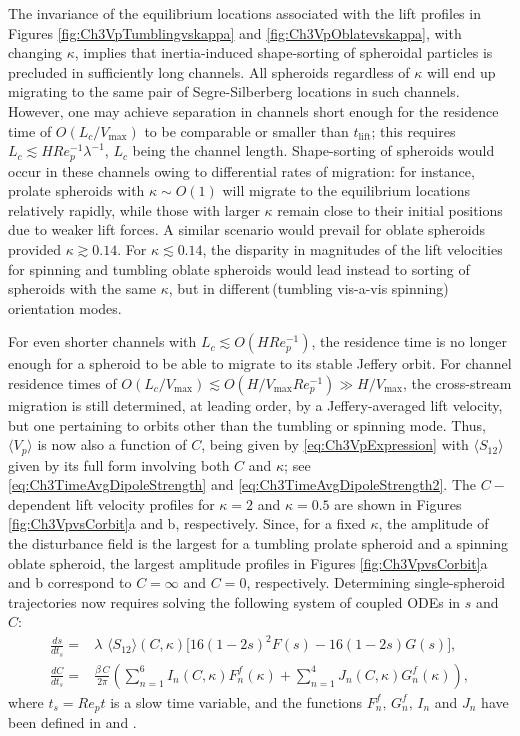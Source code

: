 \documentclass{jfm}
\begin{document}
The invariance of the equilibrium locations associated with the lift profiles in Figures \ref{fig:Ch3VpTumblingvskappa} and \ref{fig:Ch3VpOblatevskappa}, with changing $\kappa$, implies that inertia-induced shape-sorting of spheroidal particles is precluded in sufficiently long channels. All spheroids regardless of $\kappa$ will end up migrating to the same pair of Segre-Silberberg locations in such channels. However, one may achieve separation in channels short enough for the residence time of $O(L_c/V_\text{max})$ to be comparable or smaller than $t_\text{lift}$; this requires $L_c \lesssim HRe_p^{-1}\lambda^{-1}$, $L_c$ being the channel length. Shape-sorting of spheroids would occur in these channels owing to differential rates of migration: for instance, prolate spheroids with $\kappa\sim O(1)$ will migrate to the equilibrium locations relatively rapidly, while those with larger $\kappa$ remain close to their initial positions due to weaker lift forces. A similar scenario would prevail for oblate spheroids provided $\kappa \gtrsim 0.14$. For $\kappa \lesssim 0.14$, the disparity in magnitudes of the lift velocities for spinning and tumbling oblate spheroids would lead instead to sorting of spheroids  with the same $\kappa$, but in different\,(tumbling vis-a-vis spinning) orientation modes. 

For even shorter channels with $L_c \lesssim O(H Re_p^{-1})$,  the residence time is no longer enough for a spheroid to be able to migrate to its stable Jeffery orbit.  For channel residence times of $O(L_c/V_\text{max}) \lesssim O(H/V_\text{max}Re_p^{-1}) \gg H/V_\text{max}$, the cross-stream migration is still determined, at leading order, by a Jeffery-averaged lift velocity, but one pertaining to orbits other than the tumbling or spinning mode. Thus, $\langle V_p \rangle$ is now also a function of $C$, being given by \eqref{eq:Ch3VpExpression} with $\langle S_{12} \rangle$ given by its full form involving both $C$ and $\kappa$; see \eqref{eq:Ch3TimeAvgDipoleStrength} and \eqref{eq:Ch3TimeAvgDipoleStrength2}. The $C-$dependent lift velocity profiles for $\kappa=2$ and $\kappa=0.5$ are shown in Figures \ref{fig:Ch3VpvsCorbit}a and b, respectively. Since, for a fixed $\kappa$, the amplitude of the disturbance field is the largest for a tumbling prolate spheroid and a spinning oblate spheroid, the largest amplitude profiles in Figures \ref{fig:Ch3VpvsCorbit}a and b correspond to $C = \infty$ and $C = 0$, respectively. Determining single-spheroid trajectories now requires solving the following system of coupled ODEs in $s$ and $C$:
\begin{align}
\frac{ds}{dt_s} =& \lambda\,\,\langle S_{12}\rangle(C,\kappa)\big[16(1-2s)^2 F(s)-16(1-2s)G(s)\big],\, \label{eqn:sevol} \\
\frac{dC}{dt_s} =&  \frac{\beta\,C}{2\pi} \left(\sum_{n=1}^{6} I_n(C,\kappa) F_n^f(\kappa)+\sum_{n=1}^{4} J_n(C,\kappa) G_n^f(\kappa)\right), \label{eqn:Cevol}
\end{align}
where $t_s = Re_pt$ is a slow time variable, and the functions $F_n^f,\,G_n^f,\,I_n$ and $J_n$ have been defined in \cite{navaneeth2016} and \cite{marath2018}. 
\end{document}
